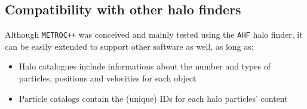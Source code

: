 \documentclass{article}
\begin{document}
\subsection{Compatibility with other halo finders}

Although \texttt{METROC++} was conceived and mainly tested using the \texttt{AHF} halo finder, it can be easily extended to 
support other software as well, as long as:

\begin{itemize}
\item Halo catalogues include informations about the number and types of particles, positions and velocities for each object
\item Particle catalogs contain the (unique) IDs for each halo particles' content
\end{itemize}
\end{document}
